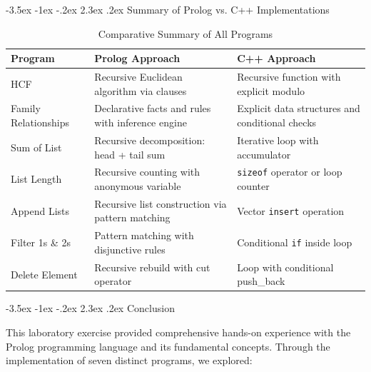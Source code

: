 \documentclass[12pt,a4paper]{article}
\makeatletter
\renewcommand{\section}{\@startsection{section}{1}{\z@}%
  {-3.5ex \@plus -1ex \@minus -.2ex}%
  {2.3ex \@plus.2ex}%
  {\normalfont\Large\bfseries}}
\makeatother
\begin{document}
\newpage
\section{Summary of Prolog vs. C++ Implementations}

\begin{table}[H]
\centering
\caption{Comparative Summary of All Programs}
\begin{tabular}{p{3.5cm}p{5cm}p{5cm}}
\toprule
\textbf{Program} & \textbf{Prolog Approach} & \textbf{C++ Approach} \\
\midrule
HCF & Recursive Euclidean algorithm via clauses & Recursive function with explicit modulo \\
Family Relationships & Declarative facts and rules with inference engine & Explicit data structures and conditional checks \\
Sum of List & Recursive decomposition: head + tail sum & Iterative loop with accumulator \\
List Length & Recursive counting with anonymous variable & \texttt{sizeof} operator or loop counter \\
Append Lists & Recursive list construction via pattern matching & Vector \texttt{insert} operation \\
Filter 1s \& 2s & Pattern matching with disjunctive rules & Conditional \texttt{if} inside loop \\
Delete Element & Recursive rebuild with cut operator & Loop with conditional push\_back \\
\bottomrule
\end{tabular}
\end{table}

\section{Conclusion}

This laboratory exercise provided comprehensive hands-on experience with the Prolog programming language and its fundamental concepts. Through the implementation of seven distinct programs, we explored:
\end{document}
